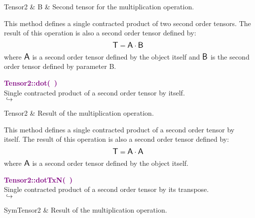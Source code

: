 \begin{tcolorbox}[width=\textwidth,myArgs,tabularx={ll|R}]
Tensor2 & B & Second tensor for the multiplication operation.
\end{tcolorbox}

This method defines a single contracted product of two second order tensors.
The result of this operation is also a second order tensor defined by:
\begin{equation*}
\mbox{\large\ensuremath{\mathsf{T}}} = \mbox{\large\ensuremath{\mathsf{A}}} \cdot \mbox{\large\ensuremath{\mathsf{B}}}
\end{equation*}
where $\mbox{\large\ensuremath{\mathsf{A}}}$ is a second order tensor defined by the object itself and $\mbox{\large\ensuremath{\mathsf{B}}}$ is the second order tensor defined by parameter B.

\textcolor{purple}{\textbf{Tensor2::dot(~)}}\label{Tensor2::dot()}\\
Single contracted product of a second order tensor by itself.\\ \hspace*{5mm}$\hookrightarrow$
\vspace*{-2em}\begin{tcolorbox}[grow to left by=-1cm, width=\textwidth-1cm,myArgs,tabularx={l|R}]
Tensor2 & Result of the multiplication operation.
\end{tcolorbox}

This method defines a single contracted product of a second order tensor by itself.
The result of this operation is also a second order tensor defined by:
\begin{equation*}
\mbox{\large\ensuremath{\mathsf{T}}} = \mbox{\large\ensuremath{\mathsf{A}}} \cdot \mbox{\large\ensuremath{\mathsf{A}}}
\end{equation*}
where $\mbox{\large\ensuremath{\mathsf{A}}}$ is a second order tensor defined by the object itself.

\textcolor{purple}{\textbf{Tensor2::dotTxN(~)}}\label{Tensor2::dotTxN()}\\
Single contracted product of a second order tensor by its transpose.\\ \hspace*{5mm}$\hookrightarrow$
\vspace*{-2em}\begin{tcolorbox}[grow to left by=-1cm, width=\textwidth-1cm,myArgs,tabularx={l|R}]
SymTensor2 & Result of the multiplication operation.
\end{tcolorbox}

